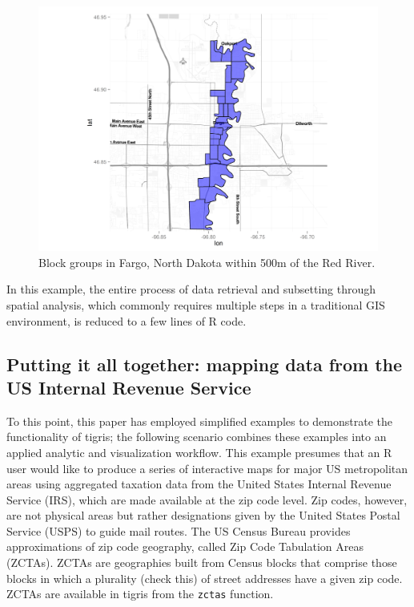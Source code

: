\begin{figure}[htbp]
  \centering
  \includegraphics[width=\textwidth]{fargo_map}
  \caption{Block groups in Fargo, North Dakota within 500m of the Red River.}
  \label{figure:fargo_map}
\end{figure}

In this example, the entire process of data retrieval and subsetting
through spatial analysis, which commonly requires multiple steps in a
traditional GIS environment, is reduced to a few lines of R code.

\subsection{Putting it all together: mapping data from the US Internal
Revenue
Service}\label{putting-it-all-together-mapping-data-from-the-us-internal-revenue-service}

To this point, this paper has employed simplified examples to
demonstrate the functionality of tigris; the following scenario combines
these examples into an applied analytic and visualization workflow. This
example presumes that an R user would like to produce a series of
interactive maps for major US metropolitan areas using aggregated
taxation data from the United States Internal Revenue Service (IRS),
which are made available at the zip code level. Zip codes, however, are
not physical areas but rather designations given by the United States
Postal Service (USPS) to guide mail routes. The US Census Bureau
provides approximations of zip code geography, called Zip Code
Tabulation Areas (ZCTAs). ZCTAs are geographies built from Census blocks
that comprise those blocks in which a plurality (check this) of street
addresses have a given zip code. ZCTAs are available in tigris from the
\texttt{zctas} function.

